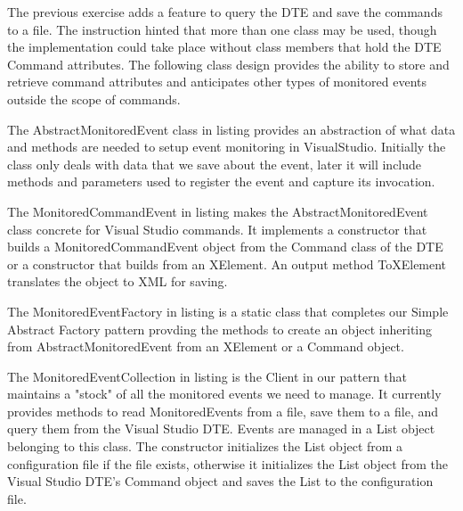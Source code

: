 \begin{Answer}
The previous exercise adds a feature to query the DTE and save the commands to a file.  The instruction hinted that more than one class may be used, though the implementation could take place without class members that hold the DTE Command attributes.  The following class design provides the ability to store and retrieve command attributes and anticipates other types of monitored events outside the scope of commands.

The AbstractMonitoredEvent class in listing %
 provides an abstraction of what data and methods are needed to setup event monitoring in VisualStudio.  Initially the class only deals with data that we save about the event, later it will include methods and parameters used to register the event and capture its invocation.

%

The MonitoredCommandEvent in listing %
makes the AbstractMonitoredEvent class concrete for Visual Studio commands.  It implements a constructor that builds a MonitoredCommandEvent object from the Command class of the DTE or a constructor that builds from an XElement.  An output method ToXElement translates the object to XML for saving.
%

The MonitoredEventFactory in listing %
 is a static class that completes our Simple Abstract Factory pattern provding the methods to create an object inheriting from AbstractMonitoredEvent from an XElement or a Command object.  
%

The MonitoredEventCollection in listing %
 is the Client in our pattern that maintains a "stock" of all the monitored events we need to manage.  It currently provides methods to read MonitoredEvents from a file, save them to a file, and query them from the Visual Studio DTE.  Events are managed in a List object belonging to this class.   The constructor initializes the List object from a configuration file if the file exists, otherwise it initializes the List object from the Visual Studio DTE's Command object and saves the List to the configuration file. 
%

\end{Answer}


